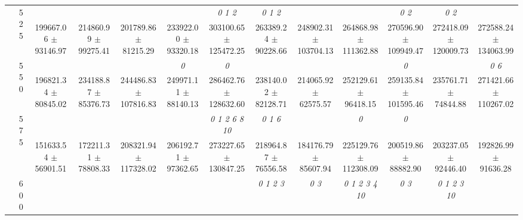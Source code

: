 \begin{table}[h]
{\begin{tabular}{
        ccccccccccccc}
 & \multirow{2}{*}{525}& \cellcolor[HTML]{EFEFEF} & \cellcolor[HTML]{EFEFEF} & \cellcolor[HTML]{EFEFEF} & \cellcolor[HTML]{EFEFEF} & \cellcolor[HTML]{EFEFEF} \textit{ 0 1 2 }& \cellcolor[HTML]{EFEFEF} \textit{ 0 1 2 }& \cellcolor[HTML]{EFEFEF} & \cellcolor[HTML]{EFEFEF} & \cellcolor[HTML]{EFEFEF} \textit{ 0 2 }& \cellcolor[HTML]{EFEFEF} \textit{ 0 2 }& \cellcolor[HTML]{EFEFEF}  \\ 
 & & \cellcolor[HTML]{EFEFEF} 199667.06 $\pm$ 93146.97& \cellcolor[HTML]{EFEFEF} 214860.99 $\pm$ 99275.41& \cellcolor[HTML]{EFEFEF} 201789.86 $\pm$ 81215.29& \cellcolor[HTML]{EFEFEF} 233922.00 $\pm$ 93320.18& \cellcolor[HTML]{EFEFEF} 303100.65 $\pm$ 125472.25& \cellcolor[HTML]{EFEFEF} 263389.24 $\pm$ 90228.66& \cellcolor[HTML]{EFEFEF} 248902.31 $\pm$ 103704.13& \cellcolor[HTML]{EFEFEF} 264868.98 $\pm$ 111362.88& \cellcolor[HTML]{EFEFEF} 270596.90 $\pm$ 109949.47& \cellcolor[HTML]{EFEFEF} 272418.09 $\pm$ 120009.73& \cellcolor[HTML]{EFEFEF} 272588.24 $\pm$ 134063.99 \\ 
 & \multirow{2}{*}{550}& & & & \textit{ 0 }& \textit{ 0 }& & & & \textit{ 0 }& & \textit{ 0 6 } \\ 
 & & 196821.34 $\pm$ 80845.02& 234188.87 $\pm$ 85376.73& 244486.83 $\pm$ 107816.83& 249971.11 $\pm$ 88140.13& 286462.76 $\pm$ 128632.60& 238140.02 $\pm$ 82128.71& 214065.92 $\pm$ 62575.57& 252129.61 $\pm$ 96418.15& 259135.84 $\pm$ 101595.46& 235761.71 $\pm$ 74844.88& 271421.66 $\pm$ 110267.02 \\ 
 & \multirow{2}{*}{575}& \cellcolor[HTML]{EFEFEF} & \cellcolor[HTML]{EFEFEF} & \cellcolor[HTML]{EFEFEF} & \cellcolor[HTML]{EFEFEF} & \cellcolor[HTML]{EFEFEF} \textit{  0  1  2  6  8 10 }& \cellcolor[HTML]{EFEFEF} \textit{ 0 1 6 }& \cellcolor[HTML]{EFEFEF} & \cellcolor[HTML]{EFEFEF} \textit{ 0 }& \cellcolor[HTML]{EFEFEF} \textit{ 0 }& \cellcolor[HTML]{EFEFEF} & \cellcolor[HTML]{EFEFEF}  \\ 
 & & \cellcolor[HTML]{EFEFEF} 151633.54 $\pm$ 56901.51& \cellcolor[HTML]{EFEFEF} 172211.31 $\pm$ 78808.33& \cellcolor[HTML]{EFEFEF} 208321.94 $\pm$ 117328.02& \cellcolor[HTML]{EFEFEF} 206192.71 $\pm$ 97362.65& \cellcolor[HTML]{EFEFEF} 273227.65 $\pm$ 130847.25& \cellcolor[HTML]{EFEFEF} 218964.87 $\pm$ 76556.58& \cellcolor[HTML]{EFEFEF} 184176.79 $\pm$ 85607.94& \cellcolor[HTML]{EFEFEF} 225129.76 $\pm$ 112308.09& \cellcolor[HTML]{EFEFEF} 200519.86 $\pm$ 88882.90& \cellcolor[HTML]{EFEFEF} 203237.05 $\pm$ 92446.40& \cellcolor[HTML]{EFEFEF} 192826.99 $\pm$ 91636.28 \\ 
 & \multirow{2}{*}{600}& & & & & & \textit{ 0 1 2 3 }& \textit{ 0 3 }& \textit{  0  1  2  3  4 10 }& \textit{ 0 3 }& \textit{  0  1  2  3 10 }&  \\ 

\end{tabular}}
\end{table}
